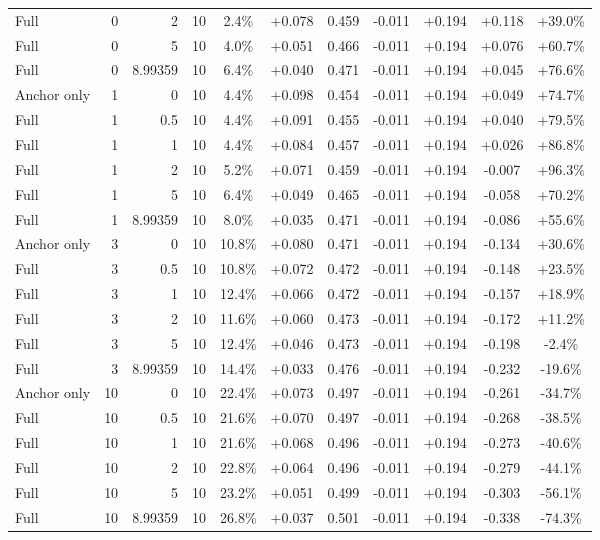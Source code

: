 \begin{table}[htbp]
\begin{tabular}{lrrrccccccc}
Full & 0 & 2 & 10 & 2.4\% & +0.078 & 0.459 & -0.011 & +0.194 & +0.118 & +39.0\% \\
Full & 0 & 5 & 10 & 4.0\% & +0.051 & 0.466 & -0.011 & +0.194 & +0.076 & +60.7\% \\
Full & 0 & 8.99359 & 10 & 6.4\% & +0.040 & 0.471 & -0.011 & +0.194 & +0.045 & +76.6\% \\
Anchor only & 1 & 0 & 10 & 4.4\% & +0.098 & 0.454 & -0.011 & +0.194 & +0.049 & +74.7\% \\
Full & 1 & 0.5 & 10 & 4.4\% & +0.091 & 0.455 & -0.011 & +0.194 & +0.040 & +79.5\% \\
Full & 1 & 1 & 10 & 4.4\% & +0.084 & 0.457 & -0.011 & +0.194 & +0.026 & +86.8\% \\
Full & 1 & 2 & 10 & 5.2\% & +0.071 & 0.459 & -0.011 & +0.194 & -0.007 & +96.3\% \\
Full & 1 & 5 & 10 & 6.4\% & +0.049 & 0.465 & -0.011 & +0.194 & -0.058 & +70.2\% \\
Full & 1 & 8.99359 & 10 & 8.0\% & +0.035 & 0.471 & -0.011 & +0.194 & -0.086 & +55.6\% \\
Anchor only & 3 & 0 & 10 & 10.8\% & +0.080 & 0.471 & -0.011 & +0.194 & -0.134 & +30.6\% \\
Full & 3 & 0.5 & 10 & 10.8\% & +0.072 & 0.472 & -0.011 & +0.194 & -0.148 & +23.5\% \\
Full & 3 & 1 & 10 & 12.4\% & +0.066 & 0.472 & -0.011 & +0.194 & -0.157 & +18.9\% \\
Full & 3 & 2 & 10 & 11.6\% & +0.060 & 0.473 & -0.011 & +0.194 & -0.172 & +11.2\% \\
Full & 3 & 5 & 10 & 12.4\% & +0.046 & 0.473 & -0.011 & +0.194 & -0.198 & -2.4\% \\
Full & 3 & 8.99359 & 10 & 14.4\% & +0.033 & 0.476 & -0.011 & +0.194 & -0.232 & -19.6\% \\
Anchor only & 10 & 0 & 10 & 22.4\% & +0.073 & 0.497 & -0.011 & +0.194 & -0.261 & -34.7\% \\
Full & 10 & 0.5 & 10 & 21.6\% & +0.070 & 0.497 & -0.011 & +0.194 & -0.268 & -38.5\% \\
Full & 10 & 1 & 10 & 21.6\% & +0.068 & 0.496 & -0.011 & +0.194 & -0.273 & -40.6\% \\
Full & 10 & 2 & 10 & 22.8\% & +0.064 & 0.496 & -0.011 & +0.194 & -0.279 & -44.1\% \\
Full & 10 & 5 & 10 & 23.2\% & +0.051 & 0.499 & -0.011 & +0.194 & -0.303 & -56.1\% \\
Full & 10 & 8.99359 & 10 & 26.8\% & +0.037 & 0.501 & -0.011 & +0.194 & -0.338 & -74.3\% \\

\end{tabular}
\end{table}
